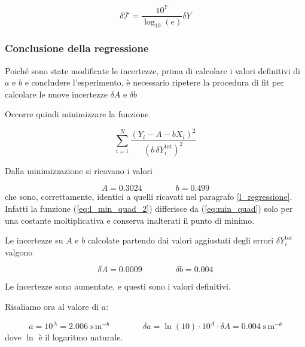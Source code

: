 \begin{equation}
    \delta \mathcal{T} = \frac{10^Y}{\log_{10}(e)} \delta Y
\end{equation}

\subsubsection{Conclusione della regressione}

Poiché sono state modificate le incertezze, prima di calcolare i valori definitivi di $a$ e $b$ e concludere l'esperimento,
è necessario ripetere la procedura di fit per calcolare le nuove incertezze $\delta A$ e $\delta b$

Occorre quindi minimizzare la funzione

\begin{equation}
    \sum_{i=1}^N \frac{(Y_i - A - bX_i)^2}{(b\,\delta Y_i^{\text{tot}})^2}
    \label{eq:l_min_quad_2}
\end{equation}

Dalla minimizzazione si ricavano i valori

\begin{equation}
    A = 0.3024 \qquad \qquad b = 0.499
\end{equation}
%
che sono, correttamente, identici a quelli ricavati nel paragrafo \ref{l_regressione}.
Infatti la funzione (\ref{eq:l_min_quad_2}) differisce da (\ref{eq:min_quad}) solo per una costante
moltiplicativa e conserva inalterati il punto di minimo.

Le incertezze su $A$ e $b$ calcolate partendo dai valori aggiustati degli errori $\delta Y_i^{\text{tot}}$
valgono

\begin{equation}
    \delta A = 0.0009 \qquad \qquad \delta b = 0.004
\end{equation}

Le incertezze sono aumentate, e questi sono i valori definitivi.

Risaliamo ora al valore di $a$:

\begin{equation}
    a = 10^A = 2.006 \; \text{s}\,\text{m}^{-b} \qquad \qquad \delta a = \ln(10) \cdot 10^A \cdot \delta A = 0.004 \; \text{s}\,\text{m}^{-b}
\end{equation}
%
dove $\ln$ è il logaritmo naturale.
